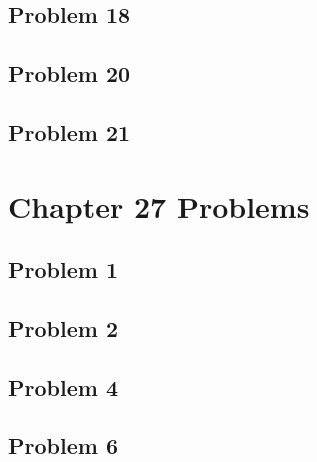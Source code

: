 \documentclass[10pt]{mypackage}
\begin{document}
\subsection{Problem 18}%
\subsection{Problem 20}%
\subsection{Problem 21}%
\section{Chapter 27 Problems}%
\subsection{Problem 1}%
\subsection{Problem 2}%
\subsection{Problem 4}%
\subsection{Problem 6}%
\end{document}
